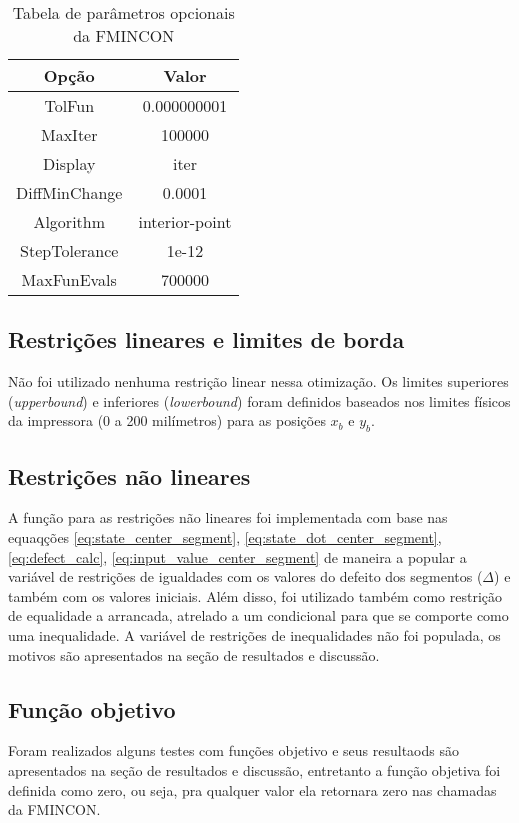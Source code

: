 \begin{table}
    \begin{center}
    \caption{Tabela de parâmetros opcionais da FMINCON}
    \label{tab:fmincon_options}
    \begin{tabular}{c c}
        Opção & Valor \\ \hline
        TolFun & 0.000000001 \\
        MaxIter & 100000 \\
        Display & iter \\
        DiffMinChange & 0.0001 \\
        Algorithm & interior-point \\
        StepTolerance & 1e-12 \\
        MaxFunEvals & 700000  \\ \hline
    \end{tabular}
    \end{center}
\end{table}

\subsection{Restrições lineares e limites de borda}
Não foi utilizado nenhuma restrição linear nessa otimização.
Os limites superiores (\textit{upperbound}) e inferiores (\textit{lowerbound}) foram definidos
baseados nos limites físicos da impressora (0 a 200 milímetros) para as posições $x_b$ e $y_b$.

\subsection{Restrições não lineares}
A função para as restrições não lineares foi implementada com base nas equaqções \ref{eq:state_center_segment},
\ref{eq:state_dot_center_segment}, \ref{eq:defect_calc}, \ref{eq:input_value_center_segment} de maneira a
popular a variável de restrições de igualdades com os valores do defeito dos segmentos ($\Delta$) e também
com os valores iniciais. 
Além disso, foi utilizado também como restrição de equalidade a arrancada, atrelado a um condicional para que
se comporte como uma inequalidade.
A variável de restrições de inequalidades não foi populada, os motivos são apresentados
na seção de resultados e discussão.

\subsection{Função objetivo}
Foram realizados alguns testes com funções objetivo e seus resultaods são apresentados na seção de resultados e discussão,
entretanto a função objetiva foi definida como zero, ou seja, pra qualquer valor ela retornara zero nas chamadas da FMINCON.

